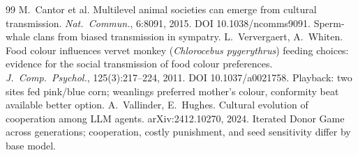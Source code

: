 \documentclass[11pt,openany]{book}
\begin{document}
\begin{thebibliography}{99}
 M.\ Cantor et al. Multilevel animal societies can emerge from cultural transmission. \textit{Nat.\ Commun.}, 6:8091, 2015. DOI 10.1038/ncomms9091. Sperm-whale clans from biased transmission in sympatry.
 L.\ Ververgaert, A.\ Whiten. Food colour influences vervet monkey (\emph{Chlorocebus pygerythrus}) feeding choices: evidence for the social transmission of food colour preferences. \textit{J.\ Comp.\ Psychol.}, 125(3):217--224, 2011. DOI 10.1037/a0021758. Playback: two sites fed pink/blue corn; weanlings preferred mother's colour, conformity beat available better option.
 A.\ Vallinder, E.\ Hughes. Cultural evolution of cooperation among LLM agents. arXiv:2412.10270, 2024. Iterated Donor Game across generations; cooperation, costly punishment, and seed sensitivity differ by base model.
\end{thebibliography}
\end{document}
